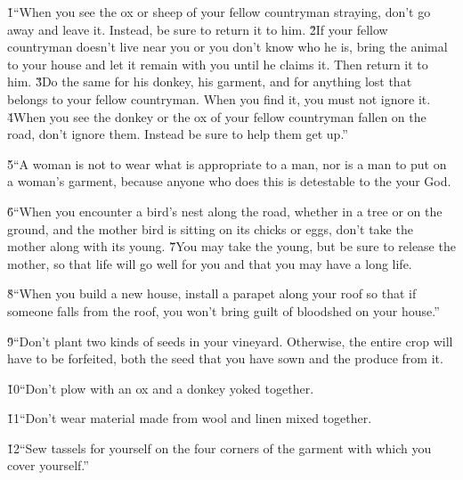 \v{1}``When you see the ox or sheep of your fellow countryman straying, don't go away and leave it. Instead, be sure to return it to him. \v{2}If your fellow countryman doesn't live near you or you don't know who he is, bring the animal to your house and let it remain with you until he claims it. Then return it to him. \v{3}Do the same for his donkey, his garment, and for anything lost that belongs to your fellow countryman. When you find it, you must not ignore it. \v{4}When you see the donkey or the ox of your fellow countryman fallen on the road, don't ignore them. Instead be sure to help them get up.''

\v{5}``A woman is not to wear what is appropriate to a man, nor is a man to put on a woman's garment, because anyone who does this is detestable to the  your God.

\v{6}``When you encounter a bird's nest along the road, whether in a tree or on the ground, and the mother bird is sitting on its chicks or eggs, don't take the mother along with its young. \v{7}You may take the young, but be sure to release the mother, so that life will go well for you and that you may have a long life.

\v{8}``When you build a new house, install a parapet along your roof so that if someone falls from the roof, you won't bring guilt of bloodshed on your house.''

\v{9}``Don't plant two kinds of seeds in your vineyard. Otherwise, the entire crop will have to be forfeited, both the seed that you have sown and the produce from it.

\v{10}``Don't plow with an ox and a donkey yoked together.

\v{11}``Don't wear material made from wool and linen mixed together.

\v{12}``Sew tassels for yourself on the four corners of the garment with which you cover yourself.''

